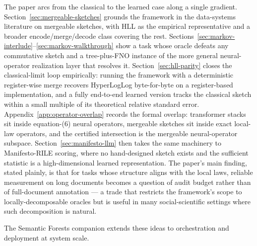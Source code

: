 The paper arcs from the classical to the learned case along a single
gradient. Section~\ref{sec:mergeable-sketches} grounds the framework in
the data-systems literature on mergeable sketches, with HLL as the
empirical representative and a broader encode/merge/decode class
covering the rest.
Sections~\ref{sec:markov-interlude}--\ref{sec:markov-walkthrough} show
a task whose oracle defeats any commutative sketch and a tree-plus-FNO
instance of the more general neural-operator realization layer that
resolves it. Section~\ref{sec:hll-parity} closes the
classical-limit loop empirically: running the framework with a
deterministic register-wise merge recovers HyperLogLog byte-for-byte on
a register-based implementation, and a fully end-to-end learned version
tracks the classical sketch within a small multiple of its theoretical
relative standard error. Appendix~\ref{app:operator-overlap} records the
formal overlap: transformer stacks sit inside equation-(6) neural
operators, mergeable sketches sit inside exact local-law operators, and
the certified intersection is the mergeable neural-operator subspace.
Section~\ref{sec:manifesto-llm} then takes the
same machinery to Manifesto-RILE scoring, where no hand-designed sketch
exists and the sufficient statistic is a high-dimensional learned
representation. The paper's main finding, stated plainly, is that for
tasks whose structure aligns with the local laws, reliable measurement
on long documents becomes a question of audit budget rather than of
full-document annotation --- a trade that restricts the framework's
scope to locally-decomposable oracles but is useful in many
social-scientific settings where such decomposition is natural.

The Semantic Forests companion extends these ideas to orchestration
and deployment at system scale.
